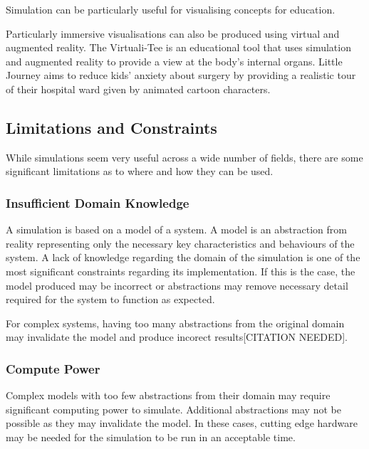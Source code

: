 \documentclass{UoYCSproject}
\begin{document}
Simulation can be particularly useful for visualising concepts for education. 

Particularly immersive visualisations can also be produced using virtual and augmented reality. The Virtuali-Tee is an educational tool that uses simulation and augmented reality to provide a view at the body's internal organs\cite{curiscope}. Little Journey aims to reduce kids' anxiety about surgery by providing a realistic tour of their hospital ward given by animated cartoon characters\cite{little_journey}.

\subsection{Limitations and Constraints}
While simulations seem very useful across a wide number of fields, there are some significant limitations as to where and how they can be used.

\subsubsection{Insufficient Domain Knowledge}
\label{domain_knowledge}
A simulation is based on a model of a system. A model is an abstraction from reality representing only the necessary key characteristics and behaviours of the system. A lack of knowledge regarding the domain of the simulation is one of the most significant constraints regarding its implementation. If this is the case, the model produced may be incorrect or abstractions may remove necessary detail required for the system to function as expected.%

For complex systems, having too many abstractions from the original domain may invalidate the model and produce incorect results[CITATION NEEDED].

\subsubsection{Compute Power}
Complex models with too few abstractions from their domain may require significant computing power to simulate. Additional abstractions may not be possible as they may invalidate the model. In these cases, cutting edge hardware may be needed for the simulation to be run in an acceptable time. 
\end{document}
